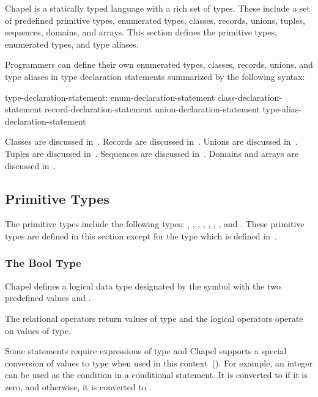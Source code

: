 \label{Types}

Chapel is a statically typed language with a rich set of types.  These
include a set of predefined primitive types, enumerated types,
classes, records, unions, tuples, sequences, domains, and arrays.
This section defines the primitive types, enumerated types, and type
aliases.

Programmers can define their own enumerated types, classes, records,
unions, and type aliases in type declaration statements summarized by
the following syntax:
\begin{syntax}
type-declaration-statement:
  enum-declaration-statement
  class-declaration-statement
  record-declaration-statement
  union-declaration-statement
  type-alias-declaration-statement
\end{syntax}

Classes are discussed in~.  Records are discussed
in~.  Unions are discussed in~.  Tuples are
discussed in~.  Sequences are discussed
in~.  Domains and arrays are discussed
in~.


\subsection{Primitive Types}
\label{Primitive_Types}

The primitive types include the following
types: , , , ,
, , , and .
These primitive types are defined in this section except for
the  type which is defined in~.

\subsubsection{The Bool Type}
\label{The_Bool_Type}

Chapel defines a logical data type designated by the symbol
 with the two predefined values  and
.

The relational operators return values of  type and the
logical operators operate on values of  type.

Some statements require expressions of  type and Chapel
supports a special conversion of values to  type when used
in this context~().
For example, an integer can be used as the condition in a conditional
statement.  It is converted to  if it is zero, and
otherwise, it is converted to .

